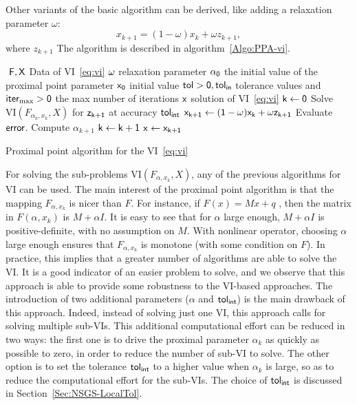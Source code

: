 Other variants of the basic algorithm can be derived, like adding a relaxation parameter $\omega$:
\begin{equation}
  \label{eq:prox-algo-2}
  x_{k+1} = (1-\omega) x_{k} + \omega z_{k+1},
\end{equation}
where $z_{k+1}$
The algorithm is described in algorithm~\ref{Algo:PPA-vi}.
\begin{algorithm}
  \begin{algorithmic}
    {\sf
      \STATE $ $
      \REQUIRE $\sf F,X$ Data of VI~\eqref{eq:vi}
      \REQUIRE $\sf \omega$ relaxation parameter
      \REQUIRE $\sf \alpha_0$ the initial value of the proximal point parameter
      \REQUIRE $\sf x_0$ initial value
      \REQUIRE $\sf tol >0, tol_{in}$ tolerance values and $\sf iter_{\max}  >0$ the max number of iterations
      \ENSURE  $\sf x$ solution of VI~\eqref{eq:vi}
      \STATE   $\sf k \leftarrow 0$ 
      \STATE Solve $\mathrm{VI}(F_{\alpha_k,x_k},X)$ for $\sf z_{k+1}$ at accuracy $\sf tol_{int}$
      \STATE $\sf x_{k+1} \leftarrow (1-\omega) x_{k} + \omega z_{k+1}$
      \STATE Evaluate $\sf error$.
      \STATE Compute $\alpha_{k+1}$
      \STATE $\sf k \leftarrow k+1$
      \ENDWHILE
      \STATE $\sf x \leftarrow x_{k+1}$ 
    }
  \end{algorithmic}
  \caption{Proximal point algorithm for the VI~\eqref{eq:vi}}  \label{Algo:PPA-vi}
\end{algorithm}

For solving the sub-problems $\mathrm{VI}(F_{\alpha,x_k},X)$, any of the previous algorithms for VI can be used.
The main interest of the proximal point algorithm is that the mapping $F_{\alpha, x_k}$ is nicer than $F$.
For instance, if $F(x)=Mx+q$ , then the matrix in $F(\alpha, x_k)$ is $M + \alpha I$.
It is easy to see that for $\alpha$ large enough, $M + \alpha I$ is positive-definite, with no assumption on $M$.
With nonlinear operator, choosing $\alpha$ large enough ensures that $F_{\alpha, x_k}$ is monotone (with some condition on $F$).
In practice, this implies that a greater number of algorithms are able to solve the VI.
It is a good indicator of an easier problem to solve, and we observe that this approach is able to provide some robustness
to the VI-based approaches.
The introduction of two additional parameters ($\alpha$ and $\sf tol_{int}$) is the main drawback of this approach.
Indeed, instead of solving just one VI, this approach calls for solving multiple sub-VIs.
This additional computational effort can be reduced in two ways: the first one is to drive the proximal parameter $\alpha_k$ as quickly as possible to zero,
in order to reduce the number of sub-VI to solve. The other option is to set the tolerance $\sf tol_{int}$ to a higher value when $\alpha_k$ is large,
so as to reduce the computational effort for the sub-VIs.
The choice of $\sf tol_{int}$ is discussed in Section~\ref{Sec:NSGS-LocalTol}.

